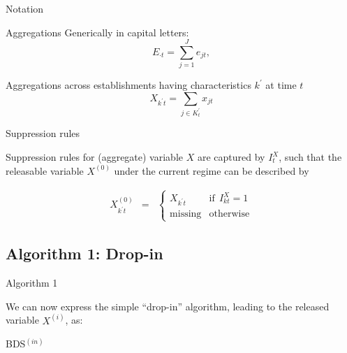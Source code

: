 \begin{frame}{Notation}
\begin{block}{Aggregations}
Generically in capital letters:
\begin{equation}
\label{eq:national_e}
E_{\cdot t} = \sum_{j=1}^J e_{jt},
\end{equation}

Aggregations across establishments having characteristics $k^\prime$ at 
time $t$
\begin{equation}
\label{eq:sum_X}
X_{k^\prime t} =  \sum_{j \in K_t^\prime} x_{jt}
\end{equation}
\end{block}
\end{frame}

\begin{frame}{Suppression rules }
\begin{block}{Suppression rules}
for (aggregate) variable $X$ are captured by $I_{t}^X$, such that the 
releasable variable $X^{(0)}$  under the current regime can be described by

\begin{eqnarray}
\label{eq:supp_x}
X_{k^\prime t}^{(0)} &=& \left \lbrace 
\begin{array}{rl}
X_{k^\prime t} &\mbox{if}~~  I_{kt}^X = 1 \\
\mbox{missing} &\mbox{otherwise}
\end{array} \right .
\end{eqnarray}
\end{block}
\end{frame}



\subsection{Algorithm 1: Drop-in}
\begin{frame}[fragile]{Algorithm 1}

We can now express the simple ``drop-in'' algorithm, leading to the released variable $X^{(i)}$, 
as:
\begin{block}{BDS$^{(in)}$}
\begin{algorithm}
\begin{algorithmic}
\Else
\EndIf
\end{algorithmic}
\end{algorithm}
\end{block}
\end{frame}




